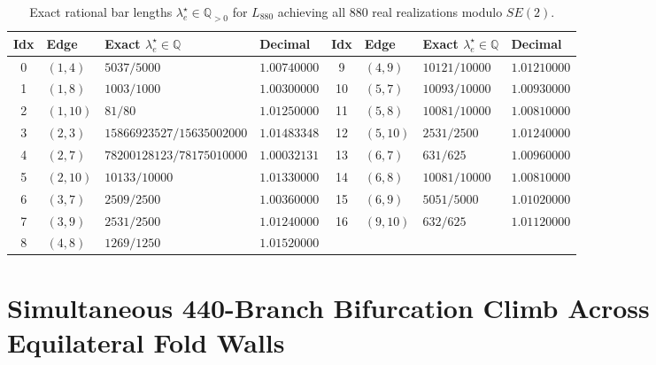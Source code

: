 \documentclass[11pt,a4paper]{article}
\theoremstyle{definition}
\theoremstyle{remark}
\begin{document}
\begin{table}[!htbp]
\centering
\caption{Exact rational bar lengths $\lambda_e^\star \in \mathbb{Q}_{>0}$ for $L_{880}$ achieving all $880$ real realizations modulo $SE(2)$.}
\label{tab:lengths}
{\footnotesize\renewcommand{\arraystretch}{1.18}
\begin{tabularx}{\linewidth}{cllXcllX}
\toprule
\textbf{Idx} & \textbf{Edge} & \textbf{Exact $\lambda_e^\star \in \mathbb{Q}$} & \textbf{Decimal} &
\textbf{Idx} & \textbf{Edge} & \textbf{Exact $\lambda_e^\star \in \mathbb{Q}$} & \textbf{Decimal} \\
\midrule
0 & $(1,4)$  & $5037/5000$ & $1.00740000$ & 9  & $(4,9)$  & $10121/10000$ & $1.01210000$ \\
1 & $(1,8)$  & $1003/1000$ & $1.00300000$ & 10 & $(5,7)$  & $10093/10000$ & $1.00930000$ \\
2 & $(1,10)$ & $81/80$     & $1.01250000$ & 11 & $(5,8)$  & $10081/10000$ & $1.00810000$ \\
3 & $(2,3)$  & $15866923527/15635002000$ & $1.01483348$ & 12 & $(5,10)$ & $2531/2500$ & $1.01240000$ \\
4 & $(2,7)$  & $78200128123/78175010000$ & $1.00032131$ & 13 & $(6,7)$  & $631/625$     & $1.00960000$ \\
5 & $(2,10)$ & $10133/10000$ & $1.01330000$ & 14 & $(6,8)$  & $10081/10000$ & $1.00810000$ \\
6 & $(3,7)$  & $2509/2500$ & $1.00360000$ & 15 & $(6,9)$  & $5051/5000$   & $1.01020000$ \\
7 & $(3,9)$  & $2531/2500$ & $1.01240000$ & 16 & $(9,10)$ & $632/625$     & $1.01120000$ \\
8 & $(4,8)$  & $1269/1250$ & $1.01520000$ &    &          &               &              \\
\bottomrule
\end{tabularx}}
\end{table}

\section{Simultaneous 440-Branch Bifurcation Climb Across Equilateral Fold Walls}
\end{document}
